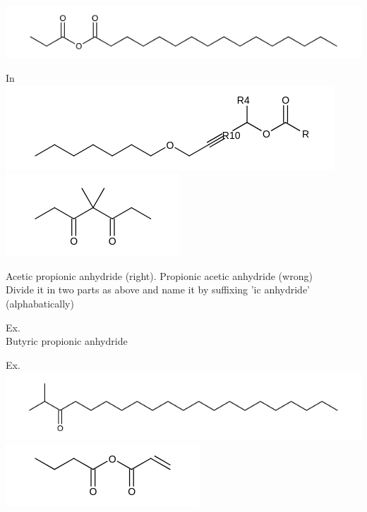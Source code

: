 \documentclass[10pt]{article}
\begin{document}
\includegraphics{smile-2a7b904b28cee2ee2e6046b8c339e221fe101a71}

In\\
\includegraphics{smile-b69ba3cec049e8d14f4e0abbbf156d413213d14c}\\
\includegraphics{smile-5810584d113f023d2a8f5e9ff949540de0a587de}

Acetic propionic anhydride (right). Propionic acetic anhydride (wrong)\\
Divide it in two parts as above and name it by suffixing 'ic anhydride' (alphabatically)

Ex.\\


Butyric propionic anhydride

Ex.\\
\includegraphics{smile-0212c550376bcebaa112c9490b523da9e0d69fa7}\\
\includegraphics{smile-9f12d69d805c227bc2d0b2ef5c272d1d4e0d2b96}
\end{document}
